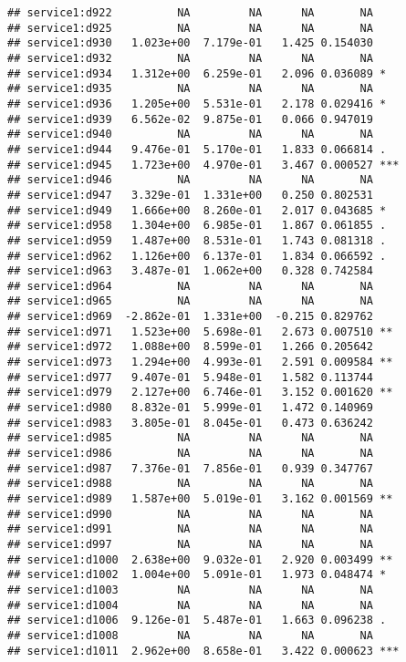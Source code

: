 \documentclass[
]{article}
\begin{document}
\begin{verbatim}
## service1:d922          NA         NA      NA       NA    
## service1:d925          NA         NA      NA       NA    
## service1:d930   1.023e+00  7.179e-01   1.425 0.154030    
## service1:d932          NA         NA      NA       NA    
## service1:d934   1.312e+00  6.259e-01   2.096 0.036089 *  
## service1:d935          NA         NA      NA       NA    
## service1:d936   1.205e+00  5.531e-01   2.178 0.029416 *  
## service1:d939   6.562e-02  9.875e-01   0.066 0.947019    
## service1:d940          NA         NA      NA       NA    
## service1:d944   9.476e-01  5.170e-01   1.833 0.066814 .  
## service1:d945   1.723e+00  4.970e-01   3.467 0.000527 ***
## service1:d946          NA         NA      NA       NA    
## service1:d947   3.329e-01  1.331e+00   0.250 0.802531    
## service1:d949   1.666e+00  8.260e-01   2.017 0.043685 *  
## service1:d958   1.304e+00  6.985e-01   1.867 0.061855 .  
## service1:d959   1.487e+00  8.531e-01   1.743 0.081318 .  
## service1:d962   1.126e+00  6.137e-01   1.834 0.066592 .  
## service1:d963   3.487e-01  1.062e+00   0.328 0.742584    
## service1:d964          NA         NA      NA       NA    
## service1:d965          NA         NA      NA       NA    
## service1:d969  -2.862e-01  1.331e+00  -0.215 0.829762    
## service1:d971   1.523e+00  5.698e-01   2.673 0.007510 ** 
## service1:d972   1.088e+00  8.599e-01   1.266 0.205642    
## service1:d973   1.294e+00  4.993e-01   2.591 0.009584 ** 
## service1:d977   9.407e-01  5.948e-01   1.582 0.113744    
## service1:d979   2.127e+00  6.746e-01   3.152 0.001620 ** 
## service1:d980   8.832e-01  5.999e-01   1.472 0.140969    
## service1:d983   3.805e-01  8.045e-01   0.473 0.636242    
## service1:d985          NA         NA      NA       NA    
## service1:d986          NA         NA      NA       NA    
## service1:d987   7.376e-01  7.856e-01   0.939 0.347767    
## service1:d988          NA         NA      NA       NA    
## service1:d989   1.587e+00  5.019e-01   3.162 0.001569 ** 
## service1:d990          NA         NA      NA       NA    
## service1:d991          NA         NA      NA       NA    
## service1:d997          NA         NA      NA       NA    
## service1:d1000  2.638e+00  9.032e-01   2.920 0.003499 ** 
## service1:d1002  1.004e+00  5.091e-01   1.973 0.048474 *  
## service1:d1003         NA         NA      NA       NA    
## service1:d1004         NA         NA      NA       NA    
## service1:d1006  9.126e-01  5.487e-01   1.663 0.096238 .  
## service1:d1008         NA         NA      NA       NA    
## service1:d1011  2.962e+00  8.658e-01   3.422 0.000623 ***

\end{verbatim}
\end{document}

